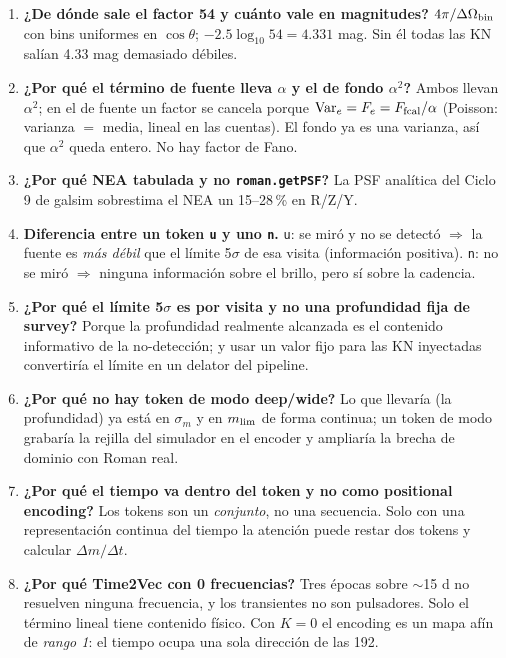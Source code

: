\documentclass[11pt,a4paper]{article}
\newcommand{\code}[1]{\texttt{\small #1}}
\begin{document}
\begin{enumerate}[itemsep=3pt]
\item \textbf{¿De dónde sale el factor 54 y cuánto vale en magnitudes?}
      $4\pi/\Delta\Omega_{\rm bin}$ con bins uniformes en $\cos\theta$; $-2.5\log_{10}54 = 4.331$ mag.
      Sin él todas las KN salían 4.33 mag demasiado débiles.

\item \textbf{¿Por qué el término de fuente lleva $\alpha$ y el de fondo $\alpha^2$?}
      Ambos llevan $\alpha^2$; en el de fuente un factor se cancela porque
      $\mathrm{Var}_e = F_e = F_{\rm fcal}/\alpha$ (Poisson: varianza $=$ media, lineal en las
      cuentas). El fondo ya es una varianza, así que $\alpha^2$ queda entero. No hay factor de Fano.

\item \textbf{¿Por qué NEA tabulada y no \code{roman.getPSF}?}
      La PSF analítica del Ciclo 9 de galsim sobrestima el NEA un 15--28\,\% en R/Z/Y.

\item \textbf{Diferencia entre un token \code{u} y uno \code{n}.}
      \code{u}: se miró y no se detectó $\Rightarrow$ la fuente es \emph{más débil} que el límite
      5$\sigma$ de esa visita (información positiva). \code{n}: no se miró $\Rightarrow$ ninguna
      información sobre el brillo, pero sí sobre la cadencia.

\item \textbf{¿Por qué el límite 5$\sigma$ es por visita y no una profundidad fija de survey?}
      Porque la profundidad realmente alcanzada es el contenido informativo de la no-detección; y
      usar un valor fijo para las KN inyectadas convertiría el límite en un delator del pipeline.

\item \textbf{¿Por qué no hay token de modo deep/wide?}
      Lo que llevaría (la profundidad) ya está en $\sigma_m$ y en $m_{\rm lim}$ de forma continua;
      un token de modo grabaría la rejilla del simulador en el encoder y ampliaría la brecha de
      dominio con Roman real.

\item \textbf{¿Por qué el tiempo va dentro del token y no como positional encoding?}
      Los tokens son un \emph{conjunto}, no una secuencia. Solo con una representación continua del
      tiempo la atención puede restar dos tokens y calcular $\Delta m/\Delta t$.

\item \textbf{¿Por qué Time2Vec con 0 frecuencias?}
      Tres épocas sobre $\sim$15 d no resuelven ninguna frecuencia, y los transientes no son
      pulsadores. Solo el término lineal tiene contenido físico. Con $K=0$ el encoding es un mapa
      afín de \emph{rango 1}: el tiempo ocupa una sola dirección de las 192.


\end{enumerate}
\end{document}

